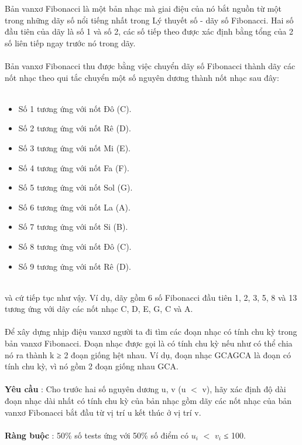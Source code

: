 Bản vanxơ Fibonacci là một bản nhạc mà giai điệu của nó bắt nguồn từ một trong những dãy số nổi tiếng nhất trong Lý thuyết số - dãy số Fibonacci. Hai số đầu tiên của dãy là số 1 và số 2, các số tiếp theo được xác định bằng tổng của 2 số liên tiếp ngay trước nó trong dãy.
\\
\\Bản vanxơ Fibonacci thu được bằng việc chuyển dãy số Fibonacci thành dãy các nốt nhạc theo qui tắc chuyển một số nguyên dương thành nốt nhạc sau đây:
\\ 
\begin{itemize}
	\item Số 1 tương ứng với nốt Đô (C).
	\item Số 2 tương ứng với nốt Rê (D).
	\item Số 3 tương ứng với nốt Mi (E).
	\item Số 4 tương ứng với nốt Fa (F).
	\item Số 5 tương ứng với nốt Sol (G).
	\item Số 6 tương ứng với nốt La (A).
	\item Số 7 tương ứng với nốt Si (B).
	\item Số 8 tương ứng với nốt Đô (C).
	\item Số 9 tương ứng với nốt Rê (D).
\end{itemize}


\\và cứ tiếp tục như vậy. Ví dụ, dãy gồm 6 số Fibonacci đầu tiên 1, 2, 3, 5, 8 và 13 tương ứng với dãy các nốt nhạc C, D, E, G, C và A.
\\
\\Để xây dựng nhịp điệu vanxơ người ta đi tìm các đoạn nhạc có tính chu kỳ trong bản vanxơ Fibonacci. Đoạn nhạc được gọi là có tính chu kỳ nếu như có thể chia nó ra thành k ≥ 2 đoạn giống hệt nhau. Ví dụ, đoạn nhạc GCAGCA là đoạn có tính chu kỳ, vì nó gồm 2 đoạn giống nhau GCA.
\\
\\\textbf{Yêu cầu } : Cho trước hai số nguyên dương u, v (u $<$ v), hãy xác định độ dài đoạn nhạc dài nhất có tính chu kỳ của bản nhạc gồm dãy các nốt nhạc của bản vanxơ Fibonacci bắt đầu từ vị trí u kết thúc ở vị trí v.
\\
\\\textbf{Ràng buộc } : 50\% số tests ứng với 50\% số điểm có $u_{i}$ $<$ $v_{i}$ ≤ 100.